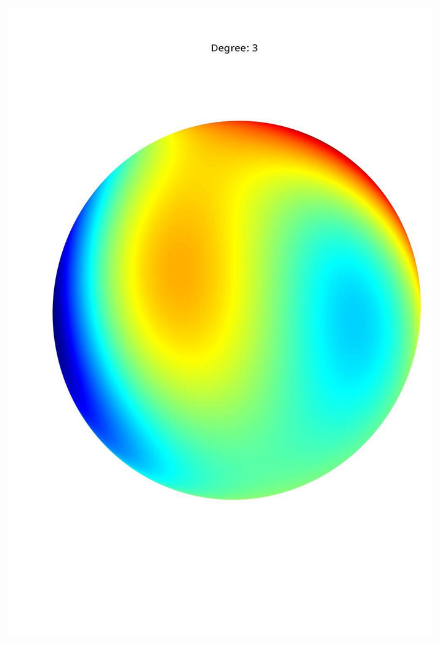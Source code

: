 \documentclass[a4paper]{article}
\theoremstyle{definition}
\begin{document}
\begin{figure}[h!]
\begin{minipage}{.245\textwidth}
        \includegraphics[width=0.95\linewidth]{media/med_3.jpg}
        \label{fig:med3}
    \end{minipage}
    \begin{minipage}{.245\textwidth}
        \centering

\end{minipage}
\end{figure}
\end{document}
